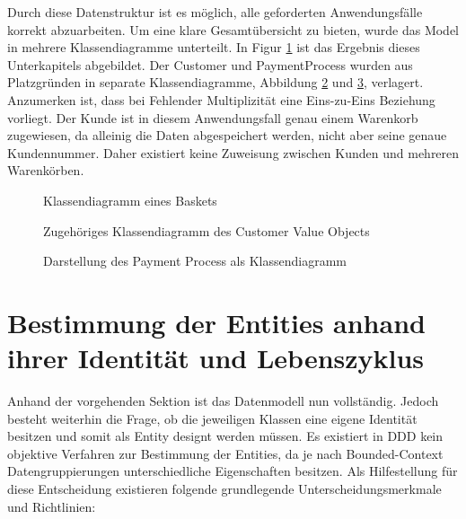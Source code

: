 
Durch diese Datenstruktur ist es möglich, alle geforderten Anwendungsfälle korrekt abzuarbeiten. Um eine klare Gesamtübersicht zu bieten, wurde das Model in mehrere Klassendiagramme unterteilt. In Figur \ref{fig:VO-Basket} ist das Ergebnis dieses Unterkapitels abgebildet. Der Customer und PaymentProcess wurden aus Platzgründen in separate Klassendiagramme, Abbildung \ref{fig:VO-Customer} und \ref{fig:VO-Payment}, verlagert. Anzumerken ist, dass bei Fehlender Multiplizität eine Eins-zu-Eins Beziehung vorliegt. Der Kunde ist in diesem Anwendungsfall genau einem Warenkorb zugewiesen, da alleinig die Daten abgespeichert werden, nicht aber seine genaue Kundennummer. Daher existiert keine Zuweisung zwischen Kunden und mehreren Warenkörben.

\begin{figure}[htbp]
	\centering
	
	\caption{Klassendiagramm eines Baskets}
	\label{fig:VO-Basket}
\end{figure}

\begin{figure}[htbp]
	\centering
	
	\caption{Zugehöriges Klassendiagramm des Customer Value Objects}
	\label{fig:VO-Customer}
\end{figure}

\begin{figure}[htbp]
	\centering
	
	\caption{Darstellung des Payment Process als Klassendiagramm}
	\label{fig:VO-Payment}
\end{figure}


\section{Bestimmung der Entities anhand ihrer Identität und Lebenszyklus}

Anhand der vorgehenden Sektion ist das Datenmodell nun vollständig. Jedoch besteht weiterhin die Frage, ob die jeweiligen Klassen eine eigene Identität besitzen und somit als Entity designt werden müssen. Es existiert in DDD kein objektive Verfahren zur Bestimmung der Entities, da je nach Bounded-Context Datengruppierungen unterschiedliche Eigenschaften besitzen. Als Hilfestellung für diese Entscheidung existieren folgende grundlegende Unterscheidungsmerkmale und Richtlinien:

